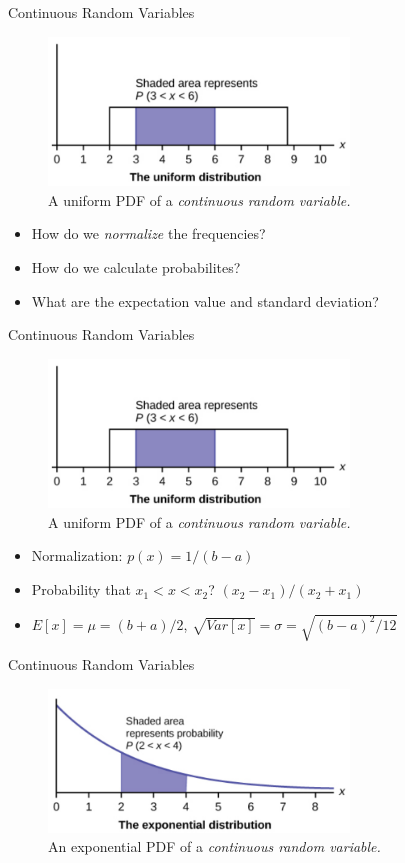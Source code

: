 \documentclass{beamer}
\begin{document}
\begin{frame}{Continuous Random Variables}
\begin{figure}
\centering
\includegraphics[width=8cm]{figures/uniform.png}
\caption{\label{fig:uniform} A uniform PDF of a \textit{continuous random variable.}}
\end{figure}
\begin{itemize}
\item How do we \textit{normalize} the frequencies?
\item How do we calculate probabilites?
\item What are the expectation value and standard deviation?
\end{itemize}
\end{frame}

\begin{frame}{Continuous Random Variables}
\begin{figure}
\centering
\includegraphics[width=8cm]{figures/uniform.png}
\caption{\label{fig:uniform} A uniform PDF of a \textit{continuous random variable.}}
\end{figure}
\begin{itemize}
\item Normalization: $p(x) = 1/(b-a)$
\item Probability that $x_1 < x < x_2$? $(x_2 - x_1)/(x_2 + x_1)$
\item $E[x] = \mu = (b+a)/2$, $\sqrt{Var[x]} = \sigma = \sqrt{(b-a)^2/12}$
\end{itemize}
\end{frame}

\begin{frame}{Continuous Random Variables}
\begin{figure}
\centering
\includegraphics[width=8cm]{figures/exp.png}
\caption{\label{fig:exp} An exponential PDF of a \textit{continuous random variable.}}
\end{figure}
\end{frame}
\end{document}
